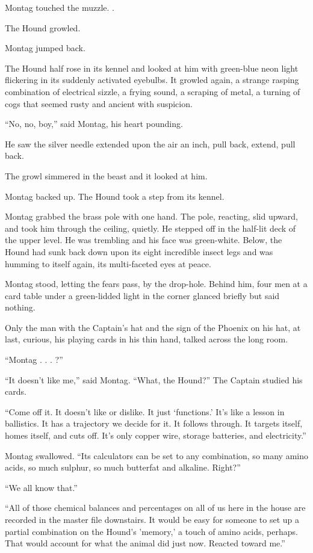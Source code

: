 \documentclass[11pt,openany]{book}
\begin{document}
Montag touched the muzzle. .

The Hound growled.

Montag jumped back.

The Hound half rose in its kennel and looked at him with green-blue neon light flickering in its suddenly activated eyebulbs. It growled again, a strange rasping combination of electrical sizzle, a frying sound, a scraping of metal, a turning of cogs that seemed rusty and ancient with suspicion.

``No, no, boy,'' said Montag, his heart pounding.

He saw the silver needle extended upon the air an inch, pull back, extend, pull back.

The growl simmered in the beast and it looked at him.

Montag backed up. The Hound took a step from its kennel.

Montag grabbed the brass pole with one hand. The pole, reacting, slid upward, and took him through the ceiling, quietly. He stepped off in the half-lit deck of the upper level. He was trembling and his face was green-white. Below, the Hound had sunk back down upon its eight incredible insect legs and was humming to itself again, its multi-faceted eyes at peace.

Montag stood, letting the fears pass, by the drop-hole. Behind him, four men at a card table under a green-lidded light in the corner glanced briefly but said nothing.

Only the man with the Captain's hat and the sign of the Phoenix on his hat, at last, curious, his playing cards in his thin hand, talked across the long room.

``Montag . . . ?''

``It doesn't like me,'' said Montag. ``What, the Hound?'' The Captain studied his cards.

``Come off it. It doesn't like or dislike. It just `functions.' It's like a lesson in ballistics. It has a trajectory we decide for it. It follows through. It targets itself, homes itself, and cuts off. It's only copper wire, storage batteries, and electricity.''

Montag swallowed. ``Its calculators can be set to any combination, so many amino acids, so much sulphur, so much butterfat and alkaline. Right?''

``We all know that.''

``All of those chemical balances and percentages on all of us here in the house are recorded in the master file downstairs. It would be easy for someone to set up a partial combination on the Hound's 'memory,' a touch of amino acids, perhaps. That would account for what the animal did just now. Reacted toward me.''
\end{document}

